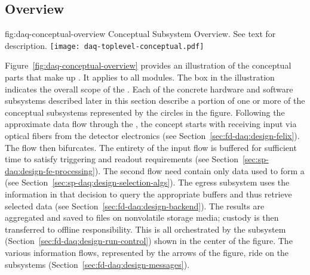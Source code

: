\subsection{Overview}
\label{sec:fd-daq:design-overview}

\begin{dunefigure}{fig:daq-conceptual-overview}{ Conceptual
    Subsystem Overview.  See text for description.}
  \texttt{[image: daq-toplevel-conceptual.pdf]}
\end{dunefigure}


Figure~\ref{fig:daq-conceptual-overview} provides an illustration of the conceptual parts that make up   . 
It applies to all  modules. 
The box in the illustration indicates the overall scope of the .
Each of the concrete hardware and software subsystems described later in this section describe a portion of one or more of the conceptual subsystems represented by the circles in the figure.
Following the approximate data flow through the , the concept starts with receiving input via optical fibers from the detector electronics (see Section~\ref{sec:fd-daq:design-felix}). 
The flow then bifurcates. 
The entirety of the input flow is buffered for sufficient time to satisfy triggering and readout requirements (see Section~\ref{sec:sp-daq:design-fe-processing}). 
The second flow need contain only data used to form a  (see Section~\ref{sec:sp-daq:design-selection-algs}).
The egress subsystem uses the information in that decision to query the appropriate buffers and thus retrieve selected data (see Section~\ref{sec:fd-daq:design-backend}).
The results are aggregated and saved to files on nonvolatile storage media; custody is then transferred to offline responsibility.
This is all orchestrated by the  subsystem (Section~\ref{sec:fd-daq:design-run-control}) shown in the center of the figure. The various information flows, represented by the arrows of the figure, ride on the  subsystems (Section~\ref{sec:fd-daq:design-messages}). 

